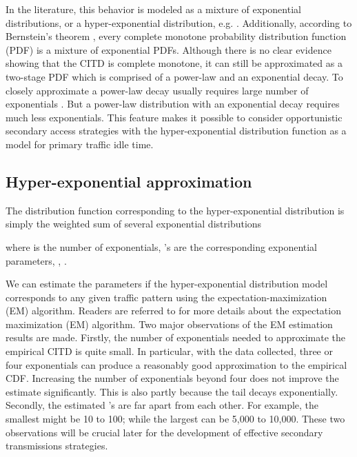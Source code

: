 \documentclass[10pt,final,journal,letterpaper]{IEEEtran}
\begin{document}
\par
In the literature, this behavior is modeled as a mixture of exponential distributions, or a hyper-exponential distribution, e.g. \cite{karagiannis2010power}. Additionally, according to Bernstein's theorem \cite{feller2008introduction}, every complete monotone probability distribution function (PDF) is a mixture of exponential PDFs. Although there is no clear evidence showing that the CITD is complete monotone, it can still be approximated as a two-stage PDF which is comprised of a power-law and an exponential decay. To closely approximate a power-law decay usually requires large number of exponentials \cite{feldmann1998fitting}. But a power-law distribution with an exponential decay requires much less exponentials. This feature makes it possible to consider opportunistic secondary access strategies with the hyper-exponential distribution function as a model for primary traffic idle time.

\subsection{Hyper-exponential approximation}\label{sec:3}
The distribution function corresponding to the hyper-exponential distribution is simply the weighted sum of several exponential distributions

where  is the number of exponentials, 's are the corresponding exponential parameters, , .

\par
We can estimate the parameters if the hyper-exponential distribution model corresponds to any given traffic pattern using the expectation-maximization (EM) algorithm. Readers are referred to \cite{bilmes1998gentle} for more details about the expectation maximization (EM) algorithm. Two major observations of the EM estimation results are made. Firstly, the number of exponentials needed to approximate the empirical CITD is quite small. In particular, with the data collected, three or four exponentials can produce a reasonably good approximation to the empirical CDF. Increasing the number of exponentials beyond four does not improve the estimate significantly. This is also partly because the tail decays exponentially. Secondly, the estimated 's are far apart from each other. For example, the smallest  might be 10 to 100; while the largest  can be 5,000 to 10,000. These two observations will be crucial later for the development of effective secondary transmissions strategies.
\end{document}
